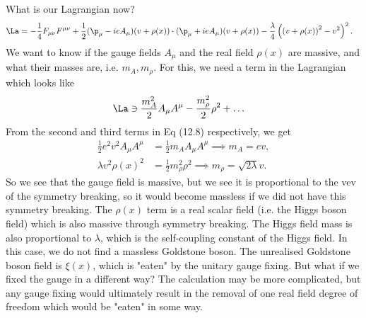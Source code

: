 \documentclass[a4paper, 11pt, normalem]{report}
\begin{document}
What is our Lagrangian now?
\begin{align}
    \La &= -\frac14F_{\mu\nu}F^{\mu\nu} + \frac12(\p_\mu-ieA_\mu)(v+\rho(x))\cdot(\p_\mu+ieA_\mu)(v+\rho(x)) - \frac{\lambda}{4}\left(\left(v+\rho(x)\right)^2-v^2\right)^2.
\end{align}
We want to know if the gauge fields $A_\mu$ and the real field $\rho(x)$ are massive, and what their masses are, i.e. $m_A,m_\rho$.
For this, we need a term in the Lagrangian which looks like
\begin{align}
    \La &\ni \frac{m_A^2}{2}A_\mu A^\mu - \frac{m_{\rho}^2}{2}\rho^2 + \dots
\end{align}
From the second and third terms in Eq (12.8) respectively, we get
\begin{align}
    \frac12 e^2v^2 A_\mu A^\mu &= \frac12 m_A A_\mu A^\mu \implies m_A = ev, \\
    \lambda v^2 \rho(x)^2 &= \frac12 m_{\rho}^2\rho^2 \implies m_{\rho} = \sqrt{2\lambda}v.
\end{align}
So we see that the gauge field is massive, but we see it is proportional to the vev of the symmetry breaking, so it would become massless if we did not have this symmetry breaking.
The $\rho(x)$ term is a real scalar field (i.e. the Higgs boson field) which is also massive through symmetry breaking.
The Higgs field mass is also proportional to $\lambda$, which is the self-coupling constant of the Higgs field.
In this case, we do not find a massless Goldstone boson.
The unrealised Goldstone boson field is $\xi(x)$, which is "eaten" by the unitary gauge fixing.
But what if we fixed the gauge in a different way?
The calculation may be more complicated, but any gauge fixing would ultimately result in the removal of one real field degree of freedom which would be "eaten" in some way.
\end{document}
